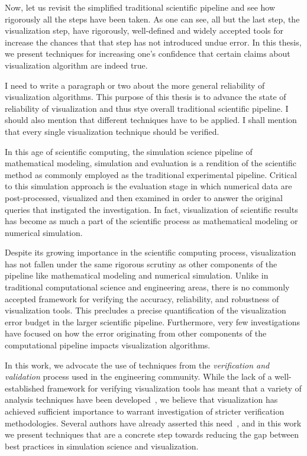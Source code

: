 Now, let us revisit the simplified traditional scientific pipeline and see how rigorously all the steps have been taken. As one can see, all but the last step, the visualization step, have rigorously, well-defined and widely accepted tools  for increase the chances that that step has not introduced undue error. In this thesis, we present techniques for increasing one's confidence that certain claims about visualization algorithm are indeed true. 

I need to write a paragraph or two about the more general reliability of visualization algorithms. This purpose of this thesis is to advance the state of reliability of visualization and thus stye overall traditional scientific pipeline.
I should also mention that different techniques have to be applied. I shall mention that every single visualization technique should be verified. 

In this age of scientific computing, 
the simulation science pipeline of mathematical
modeling, simulation and evaluation is
a rendition of the scientific method as commonly employed as
the traditional experimental pipeline.
Critical to this simulation approach is
the evaluation stage in which numerical
data are post-processed, visualized and 
then examined in order to answer the original
queries that instigated the investigation.
In fact, visualization of scientific results has become
as much a part of the scientific process as 
mathematical modeling or numerical simulation.  

Despite its growing importance in the
scientific computing process, visualization has not fallen under the same
rigorous scrutiny as other components of the pipeline
like mathematical modeling and numerical simulation.
Unlike in traditional computational science and engineering areas,
there is no commonly accepted framework for verifying the accuracy, reliability, 
and robustness of visualization tools. This precludes
a precise quantification of the visualization error budget in the 
larger scientific pipeline.
Furthermore, very few investigations have focused on how the error originating from 
other components of the computational pipeline
impacts visualization algorithms. %

In this work, we advocate the use of techniques from the
\emph{verification and validation} process used in the engineering
community. While
the lack of a well-established framework for verifying visualization
tools has meant that a variety of analysis techniques have been
developed~\cite{zhou01,tory04}, we believe that visualization 
has achieved sufficient importance to warrant investigation of
stricter verification methodologies. Several authors have
already asserted this need~\cite{globus95,kirby-vv-08}, and in this work we
present techniques that are a concrete step towards reducing the
gap between best practices in simulation science and visualization.


